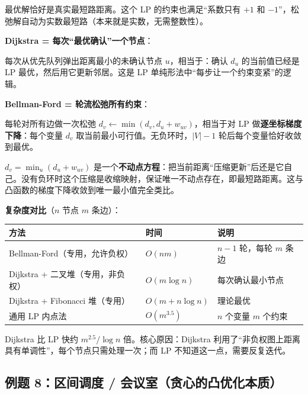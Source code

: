 \documentclass[12pt, a4paper]{ctexart}
\begin{document}
\begin{blackboard}
最优解恰好是真实最短路距离。这个 LP 的约束也满足``系数只有 $+1$ 和 $-1$''，松弛解自动为实数最短路（本来就是实数，无需整数性）。

\textbf{Dijkstra = 每次``最优确认''一个节点}：

每次从优先队列弹出距离最小的未确认节点 $u$，相当于：确认 $d_u$ 的当前值已经是 LP 最优，然后用它更新邻居。这是 LP 单纯形法中``每步让一个约束变紧''的逻辑。

\textbf{Bellman-Ford = 轮流松弛所有约束}：

每轮对所有边做一次松弛 $d_v \leftarrow \min(d_v, d_u + w_{uv})$，相当于对 LP 做\textbf{逐坐标梯度下降}：每个变量 $d_v$ 取当前最小可行值。无负环时，$|V|-1$ 轮后每个变量恰好收敛到最优。

\begin{insight}
$d_v = \min_u(d_u + w_{uv})$ 是一个\textbf{不动点方程}：把当前距离``压缩更新''后还是它自己。没有负环时这个压缩是收缩映射，保证唯一不动点存在，即最短路距离。这与凸函数的梯度下降收敛到唯一最小值完全类比。
\end{insight}

\textbf{复杂度对比}（$n$ 节点 $m$ 条边）：

\begin{center}
\begin{tabular}{lll}
\toprule
方法 & 时间 & 说明 \\
\midrule
Bellman-Ford（专用，允许负权） & $O(nm)$ & $n-1$ 轮，每轮 $m$ 条边 \\
Dijkstra + 二叉堆（专用，非负权） & $O(m \log n)$ & 每次确认最小节点 \\
Dijkstra + Fibonacci 堆（专用） & $O(m + n\log n)$ & 理论最优 \\
通用 LP 内点法 & $O(m^{3.5})$ & $n$ 个变量 $m$ 个约束 \\
\bottomrule
\end{tabular}
\end{center}

Dijkstra 比 LP 快约 $m^{2.5}/\log n$ 倍。核心原因：Dijkstra 利用了``非负权图上距离具有单调性''，每个节点只需处理一次；而 LP 不知道这一点，需要反复迭代。

\end{blackboard}

\subsection{例题 8：区间调度 / 会议室（贪心的凸优化本质）}
\end{document}
